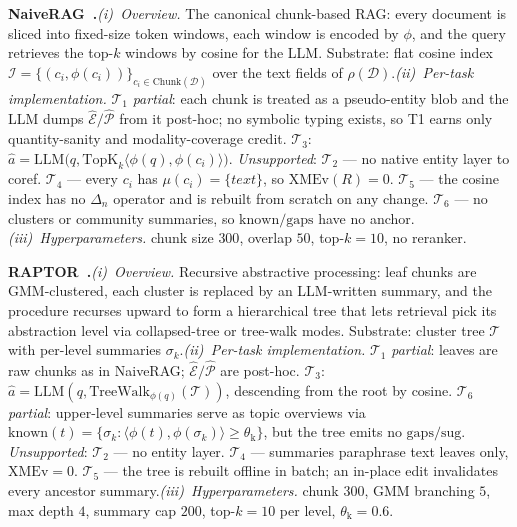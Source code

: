 \documentclass{article}
\begin{document}
\noindent\textbf{NaiveRAG~\citep{RAG}.}\quad\emph{(i)~Overview.} The canonical chunk-based RAG: every document is sliced into fixed-size token windows, each window is encoded by $\phi$, and the query retrieves the top-$k$ windows by cosine for the LLM. Substrate: flat cosine index $\mathcal{I}\!=\!\{(c_i,\phi(c_i))\}_{c_i\in\mathrm{Chunk}(\mathcal{D})}$ over the text fields of $\rho(\mathcal{D})$.\quad\emph{(ii)~Per-task implementation.} $\mathcal{T}_1$ \emph{partial}: each chunk is treated as a pseudo-entity blob and the LLM dumps $\hat{\mathcal{E}}/\hat{\mathcal{P}}$ from it post-hoc; no symbolic typing exists, so T1 earns only quantity-sanity and modality-coverage credit. $\mathcal{T}_3$: $\hat{a}\!=\!\mathrm{LLM}\bigl(q,\mathrm{TopK}_{k}\!\langle\phi(q),\phi(c_i)\rangle\bigr)$. \emph{Unsupported}: $\mathcal{T}_2$ — no native entity layer to coref. $\mathcal{T}_4$ — every $c_i$ has $\mu(c_i)\!=\!\{\textit{text}\}$, so $\mathrm{XMEv}(R)\!=\!0$. $\mathcal{T}_5$ — the cosine index has no $\Delta_n$ operator and is rebuilt from scratch on any change. $\mathcal{T}_6$ — no clusters or community summaries, so $\mathrm{known}/\mathrm{gaps}$ have no anchor.\quad\emph{(iii)~Hyperparameters.} chunk size $300$, overlap $50$, top-$k\!=\!10$, no reranker.

\noindent\textbf{RAPTOR~\citep{RAPTOR}.}\quad\emph{(i)~Overview.} Recursive abstractive processing: leaf chunks are GMM-clustered, each cluster is replaced by an LLM-written summary, and the procedure recurses upward to form a hierarchical tree that lets retrieval pick its abstraction level via collapsed-tree or tree-walk modes. Substrate: cluster tree $\mathcal{T}$ with per-level summaries $\sigma_k$.\quad\emph{(ii)~Per-task implementation.} $\mathcal{T}_1$ \emph{partial}: leaves are raw chunks as in NaiveRAG; $\hat{\mathcal{E}}/\hat{\mathcal{P}}$ are post-hoc. $\mathcal{T}_3$: $\hat{a}\!=\!\mathrm{LLM}(q,\mathrm{TreeWalk}_{\phi(q)}(\mathcal{T}))$, descending from the root by cosine. $\mathcal{T}_6$ \emph{partial}: upper-level summaries serve as topic overviews via $\mathrm{known}(t)\!=\!\{\sigma_k\!:\!\langle\phi(t),\phi(\sigma_k)\rangle\!\geq\!\theta_{\mathrm{k}}\}$, but the tree emits no $\mathrm{gaps}/\mathrm{sug}$. \emph{Unsupported}: $\mathcal{T}_2$ — no entity layer. $\mathcal{T}_4$ — summaries paraphrase text leaves only, $\mathrm{XMEv}\!=\!0$. $\mathcal{T}_5$ — the tree is rebuilt offline in batch; an in-place edit invalidates every ancestor summary.\quad\emph{(iii)~Hyperparameters.} chunk $300$, GMM branching $5$, max depth $4$, summary cap $200$, top-$k\!=\!10$ per level, $\theta_{\mathrm{k}}\!=\!0.6$.
\end{document}
